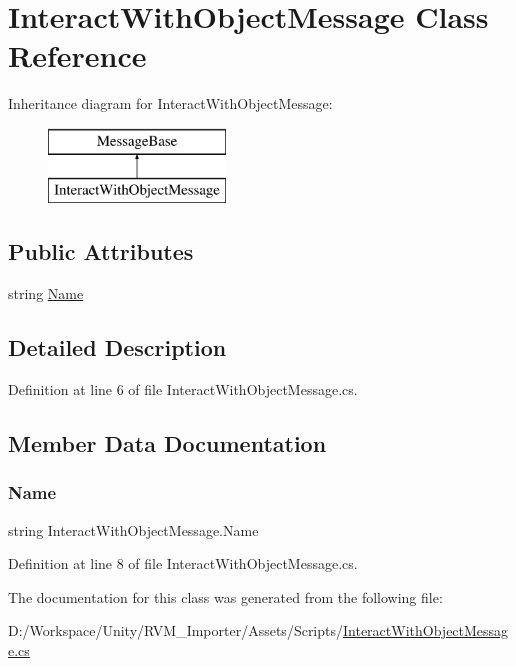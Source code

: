 \hypertarget{class_interact_with_object_message}{}\section{Interact\+With\+Object\+Message Class Reference}
\label{class_interact_with_object_message}
Inheritance diagram for Interact\+With\+Object\+Message\+:\begin{figure}[H]
\begin{center}
\leavevmode
\includegraphics[height=2.000000cm]{class_interact_with_object_message}
\end{center}
\end{figure}
\subsection*{Public Attributes}
\begin{DoxyCompactItemize}
\item 
string \mbox{\hyperlink{class_interact_with_object_message_ad1ac5a9bdebdd0806dcada8a94f144fa}{Name}}
\end{DoxyCompactItemize}


\subsection{Detailed Description}


Definition at line 6 of file Interact\+With\+Object\+Message.\+cs.



\subsection{Member Data Documentation}
\mbox{\label{class_interact_with_object_message_ad1ac5a9bdebdd0806dcada8a94f144fa}} 
\subsubsection{\texorpdfstring{Name}{Name}}
{\footnotesize\ttfamily string Interact\+With\+Object\+Message.\+Name}



Definition at line 8 of file Interact\+With\+Object\+Message.\+cs.



The documentation for this class was generated from the following file\+:\begin{DoxyCompactItemize}
\item 
D\+:/\+Workspace/\+Unity/\+R\+V\+M\+\_\+\+Importer/\+Assets/\+Scripts/\mbox{\hyperlink{_interact_with_object_message_8cs}{Interact\+With\+Object\+Message.\+cs}}\end{DoxyCompactItemize}
